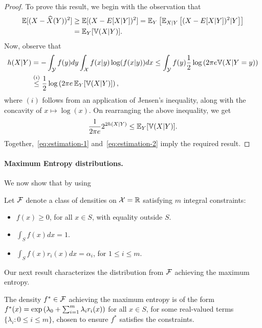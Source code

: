         \begin{proof}
            To prove this result, we begin with the observation that 
            \begin{align}
                \mathbb{E}[(X - \widehat{X}(Y))^2] &\geq \mathbb{E}[ (X - E[X|Y])^2 ] = \mathbb{E}_Y \left[ \mathbb{E}_{X|Y} \left[ (X - E[X|Y])^2 |Y\right] \right]  \\
                & =  \mathbb{E}_Y[\mathbb{V}(X|Y)].  \label{eq:estimation-1}
            \end{align}
        Now, observe that 
        \begin{align}
            h(X|Y) &= -\int_{\mathcal{Y}} f(y)dy  \int_{\mathcal{X}} f(x|y) \log (f(x|y)) dx \leq \int_{\mathcal{Y}} f(y) \frac{1}{2}\log \left( 2 \pi e \mathbb{V}(X|Y=y) \right) \\ 
            & \stackrel{(i)}{\leq} \frac{1}{2} \log \left( 2 \pi e \, \mathbb{E}_Y[\mathbb{V}(X|Y)] \right), 
        \end{align}
        where $(i)$ follows from an application of  Jensen's inequality, along with the concavity of $x \mapsto \log(x)$. On rearranging the above inequality, we get 
        \begin{align}
            \frac{1}{2\pi e} 2^{2h(X|Y)} \leq \mathbb{E}_Y[\mathbb{V}(X|Y)]. \label{eq:estimation-2}
        \end{align}
        Together,~\eqref{eq:estimation-1} and~\eqref{eq:estimation-2} imply the required result. 
        \end{proof}


        \paragraph{Maximum Entropy distributions.} We now show that by using 
        
        Let $\mathcal{F}$ denote a class of densities on $\mathcal{X} = \mathbb{R}$ satisfying $m$ integral constraints: 
        \begin{itemize}
            \item $f(x) \geq 0$, for all $x \in S$, with equality outside $S$. 
            \item $\int_S f(x) dx = 1$. 
            \item $\int_S f(x) r_i(x)dx = \alpha_i$, for $1 \leq i \leq m$. 
        \end{itemize}
        Our next result characterizes the distribution from $\mathcal{F}$ achieving the maximum entropy. 
        \begin{proposition}
            \label{prop:max-entropy} The density $f^* \in \mathcal{F}$ achieving the maximum entropy is of the form $f^*(x) = \exp \left( \lambda_0 + \sum_{i=1}^m \lambda_i r_i(x) \right)$ for all $x \in S$, for some real-valued terms $\{\lambda_i: 0 \leq i \leq m\}$, chosen to ensure $f^*$ satisfies the constraints.  
        \end{proposition}

